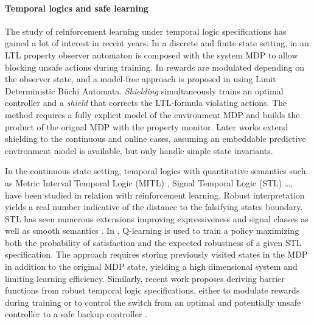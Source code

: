 \documentclass[anonymous=true,format=sigconf, screen=true, review=false]{acmart}
\begin{document}
\paragraph{Temporal logics and safe learning}
The study of reinforcement learning under temporal logic
specifications has gained a lot of interest in recent years.
In a discrete and finite state setting, in \cite{2015wencorrectbysynthesis} an LTL property observer automaton
is composed with the system MDP to allow blocking unsafe actions
during training. In \cite{2019gaoreducedvariance, 2019hasanbeigreinforcement} rewards are modulated depending on
the observer state, and a model-free approach is proposed
in \cite{2019hasanbeigtowards} using Limit Deterministic B\"uchi
Automata. \emph{Shielding} \cite{2018alshiekhshielding} simultaneously trains an
optimal controller and a \emph{shield} that corrects the
LTL-formula violating actions. %
The method requires a fully explicit model
of the environment MDP and builds the product of the orignal MDP with the 
property monitor. Later works extend shielding to the continuous
\cite{2019zhangosafemultiagentrl, 2020bastanisafe} and online
\cite{2019bastanionlineshielding} cases, assuming an embeddable
predictive environment model is available, but only handle simple state invariants.

In the continuous state setting, temporal logics with quantitative 
semantics such as
Metric Interval Temporal Logic (MITL)
\cite{2009fainekosrobustnessMITL}, Signal Temporal Logic (STL)
\cite{2013donzestl} \dots, have been studied in relation with
reinforcement learning. Robust interpretation yields a real number
indicative of the distance to the falsifying states boundary. STL has
seen numerous extensions improving expressiveness and signal classes
\cite{2014brimstlstar, 2015akazakiaveragemtl, 2019bakhirkinbeyondstl, 2019abbasrobustnessgeneral} as
well as smooth semantics \cite{2019haghighismoothstl, 2019mehdipouragm, 2021gilpinsmoothstl}.  In
\cite{2016aksarayqlearningrobust}, Q-learning is used to train a policy maximizing both
the probability of satisfaction and the expected robustness of a given STL specification. 
The approach requires storing previously
visited states in the MDP in addition to the original MDP state,
yielding a high dimensional system and limiting learning
efficiency. Similarly, recent work proposes deriving barrier functions
from robust temporal logic specifications, either to modulate
rewards during training \cite{2019lilogicguidedsaferlbarrier}
or to control the switch from an optimal and potentially unsafe
controller to a safe backup controller
\cite{2019lindemanncontrolbarrierstl}.
\end{document}

